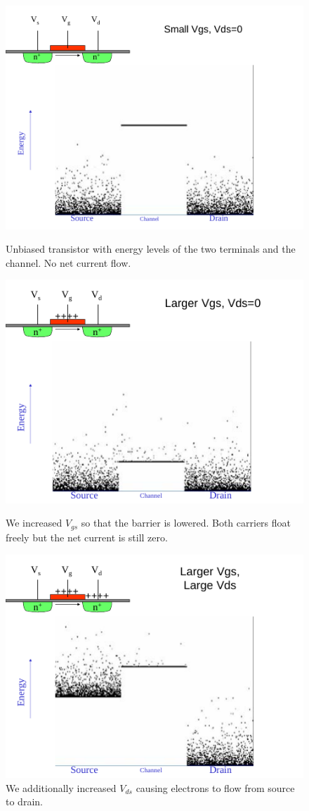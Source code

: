 \documentclass[main]{subfiles}
\begin{document}
\begin{figure}[H]
\centering
\includegraphics[scale=1]{figs/unbiased_transistor.pdf}
\caption{Unbiased transistor with energy levels of the two terminals and the channel. No net current flow.}
\includegraphics[scale=1]{figs/larger_vgs_transistor.pdf}
\caption{We increased $V_{gs}$ so that the barrier is lowered. Both carriers float freely but the net current is still zero.}
\includegraphics[scale=1]{figs/larger_vgs_vds_transistor.pdf}
\caption{We additionally increased $V_{ds}$ causing electrons to flow from source to drain.}
\end{figure}
\end{document}
